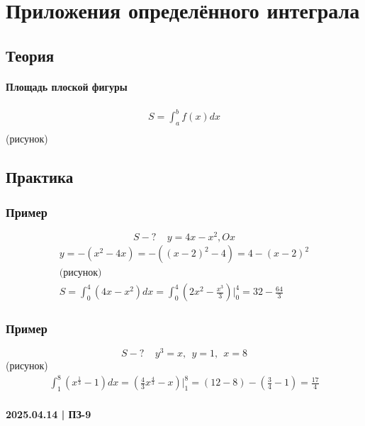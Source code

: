 \documentclass{article}
\begin{document}
\section{Приложения определённого интеграла}

\subsection{Теория}

\paragraph{Площадь плоской фигуры}
\begin{gather*}
    S = \int_{a}^{b} f(x) dx \\
\end{gather*}
(рисунок)


\subsection{Практика}
\subsubsection{Пример}
\[
    S - ? ~~~~~ y = 4x - x^2, Ox
\]
\begin{gather*}
    y = -(x^2 - 4x) = -\left((x - 2)^2 - 4\right) = 4 - (x - 2)^2 \\
    \text{(рисунок)} \\
    S = \int_{0}^{4} (4x - x^2) dx = \int_{0}^{4} \left(2x^2 - \frac{x^3}{3}\right) \Bigg|_{0}^{4} = 32 - \frac{64}{3}
\end{gather*}

\subsubsection{Пример}
\[
    S - ? ~~~~~ y^3 = x, ~~y = 1, ~~x = 8
\]
(рисунок)
\begin{gather*}
    \int_{1}^{8} \left(x^{\frac{1}{3}} - 1\right) dx =
    \left(\frac{4}{3} x^{\frac{4}{3}} - x\right) \Bigg|_{1}^{8} =
    (12 - 8) - \left(\frac{3}{4} - 1\right) = \frac{17}{4}
\end{gather*}




\newpage
\paragraph{2025.04.14 | ПЗ-9}
\end{document}
